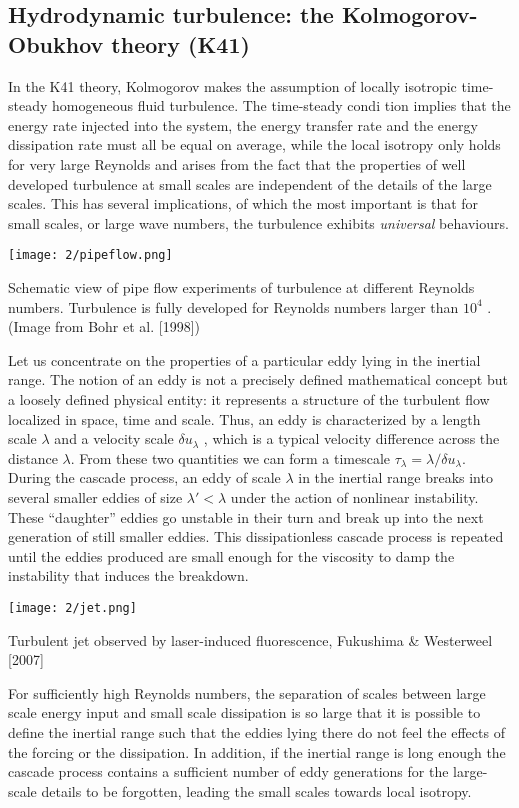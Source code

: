 \subsection{Hydrodynamic turbulence: the Kolmogorov-Obukhov theory (K41)}
In the K41 theory, Kolmogorov makes the assumption of locally isotropic time-steady homogeneous fluid turbulence. The time-steady condi tion implies that the energy rate injected into the system, the energy transfer rate and the energy dissipation rate must all be equal on average, while the
local isotropy only holds for very large Reynolds and arises from the fact that
the properties of well developed turbulence at small scales are independent
of the details of the large scales. This has several implications, of which the
most important is that for small scales, or large wave numbers, the turbulence
exhibits \emph{universal} behaviours.
\begin{marginfigure}
\texttt{[image: 2/pipeflow.png]}
\caption{Schematic view of pipe flow experiments of turbulence at different
Reynolds numbers. Turbulence is fully developed for Reynolds
numbers larger than $10^4$ . (Image from Bohr et al. [1998])}
\end{marginfigure}
Let us concentrate on the properties of a particular eddy lying in the inertial range. The notion of an eddy is not a precisely defined mathematical concept but a loosely defined physical entity: it represents a structure of the turbulent flow localized in space, time and scale. Thus, an eddy is characterized by a length scale $\lambda$ and a velocity scale $\delta u_\lambda$ , which is a typical velocity difference across the distance $\lambda$. From these two quantities we can form a timescale $\tau_\lambda=\lambda/\delta u_\lambda$.
During the cascade process, an eddy of scale $\lambda$ in the inertial range breaks into several smaller eddies of size $\lambda'<\lambda$ under the action of nonlinear instability. These “daughter” eddies go unstable in their turn and break up into the next generation of still smaller eddies. This dissipationless cascade process is repeated until
the eddies produced are small enough for the viscosity to damp the instability that induces the breakdown. 
\begin{marginfigure}
\texttt{[image: 2/jet.png]}
\caption{Turbulent jet observed by laser-induced fluorescence, Fukushima \& Westerweel [2007]}
\end{marginfigure}
For sufficiently high Reynolds numbers, the separation of scales between large scale energy input and small scale dissipation is so large that it is possible to define the inertial range such that the eddies lying there
do not feel the effects of the forcing or the dissipation. In addition, if the inertial range is long enough the
cascade process contains a sufficient number of eddy generations for the large-scale details to be forgotten, leading the small scales towards local isotropy. 

